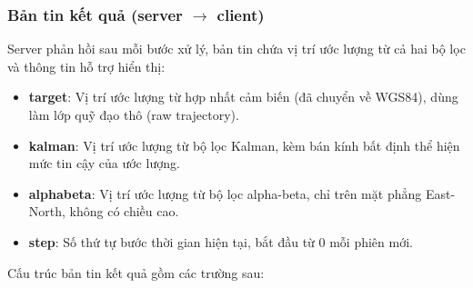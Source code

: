 \subsubsection{Bản tin kết quả (server \texorpdfstring{$\to$}{->} client)}

\hspace{0.5cm} Server phản hồi sau mỗi bước xử lý, bản tin chứa vị trí ước lượng từ cả hai bộ lọc và thông tin hỗ trợ hiển thị:

\begin{itemize}
    \item \textbf{target}: Vị trí ước lượng từ hợp nhất cảm biến (đã chuyển về WGS84), dùng làm lớp quỹ đạo thô (raw trajectory).

    \item \textbf{kalman}: Vị trí ước lượng từ bộ lọc Kalman, kèm bán kính bất định thể hiện mức tin cậy của ước lượng.

    \item \textbf{alphabeta}: Vị trí ước lượng từ bộ lọc alpha-beta, chỉ trên mặt phẳng East-North, không có chiều cao.

    \item \textbf{step}: Số thứ tự bước thời gian hiện tại, bắt đầu từ 0 mỗi phiên mới.
\end{itemize}



Cấu trúc bản tin kết quả gồm các trường sau:

\begin{table}[H]
\centering
{}
\caption{Các trường chính trong bản tin kết quả}
\label{tab:result-fields}
\end{table}

